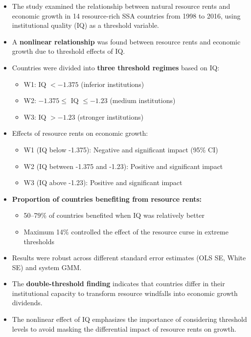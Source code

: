\documentclass[10pt, oneside]{article}
\begin{document}
\begin{itemize}
	\item The study examined the relationship between natural resource rents and economic growth in 14 resource-rich SSA countries from 1998 to 2016, using institutional quality (IQ) as a threshold variable.
	\item A \textbf{nonlinear relationship} was found between resource rents and economic growth due to threshold effects of IQ.
	\item Countries were divided into \textbf{three threshold regimes} based on IQ:
	      \begin{itemize}
		      \item W1: IQ $< -1.375$ (inferior institutions)
		      \item W2: $-1.375 \leq$ IQ $\leq -1.23$ (medium institutions)
		      \item W3: IQ $> -1.23$ (stronger institutions)
	      \end{itemize}
	\item Effects of resource rents on economic growth:
	      \begin{itemize}
		      \item W1 (IQ below -1.375): Negative and significant impact (95\% CI)
		      \item W2 (IQ between -1.375 and -1.23): Positive and significant impact
		      \item W3 (IQ above -1.23): Positive and significant impact
	      \end{itemize}
	\item \textbf{Proportion of countries benefiting from resource rents:}
	      \begin{itemize}
		      \item 50–79\% of countries benefited when IQ was relatively better
		      \item Maximum 14\% controlled the effect of the resource curse in extreme thresholds
	      \end{itemize}
	\item Results were robust across different standard error estimates (OLS SE, White SE) and system GMM.
	\item The \textbf{double-threshold finding} indicates that countries differ in their institutional capacity to transform resource windfalls into economic growth dividends.
	\item The nonlinear effect of IQ emphasizes the importance of considering threshold levels to avoid masking the differential impact of resource rents on growth.

\end{itemize}
\end{document}
